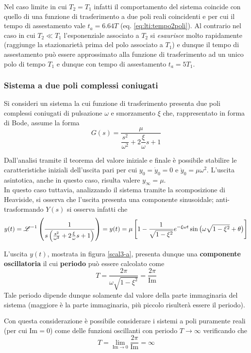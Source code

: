 			Nel caso limite in cui $T_2 = T_1$ infatti il comportamento del sistema coincide con quello di una funzione di trasferimento a due poli reali coincidenti e per cui il tempo di assestamento vale $t_a = 6.64 T$ (eq. \ref{eq:lti:tempo2poli}). Al contrario nel caso in cui $T_2 \ll T_1$ l'esponenziale associato a $T_2$ si \textit{esaurisce} molto rapidamente (raggiunge la stazionarietà prima del polo associato a $T_1$) e dunque il tempo di assestamento può essere approssimato alla funzione di trasferimento ad un unico polo di tempo $T_1$ e dunque con tempo di assestamento $t_a =5T_1$.
			
		\subsubsection{Sistema a due poli complessi coniugati}
			Si consideri un sistema la cui funzione di trasferimento presenta due poli complessi coniugati di pulsazione $\omega$ e smorzamento $\xi$ che, rappresentato in forma di Bode, assume la forma
			\[ G(s) = \frac \mu {\dfrac{s^2}{\omega^2} + 2 \dfrac \xi \omega s + 1} \] 
			
			Dall'analisi tramite il teorema del valore iniziale e finale è possibile stabilire le caratteristiche iniziali dell'uscita pari per cui $y_0 = \dot y_0 = 0$ e $\ddot y_0 = \mu \omega^2$.	L'uscita asintotica, anche in questo caso, risulta valere $y_\infty = \mu$. \\
			In questo caso tuttavia, analizzando il sistema tramite la scomposizione di Heaviside, si osserva che l'uscita presenta una componente sinusoidale; anti-trasformando $Y(s)$ si osserva infatti che
			\[ y(t) = \mathscr {L}^{-1} \left( \frac 1 {s \left( \frac{s^2}{\omega^2} + 2 \frac \xi \omega s + 1 \right)}   \right) = y(t) = \mu \left[ 1 - \frac 1 {\sqrt{1-\xi^2}} e^{-\xi\omega t} \sin\big(\omega \sqrt{1-\xi^2} + \theta\big) \right] \]
			
			L'uscita $y(t)$, mostrata in figura \ref{scal3-a}, presenta dunque una \textbf{componente oscillatoria} il cui \textbf{periodo} può essere calcolato come
			\begin{equation}
				T = \frac{2\pi}{\omega \sqrt{1-\xi^2}} = \frac{2\pi}{\textrm{Im}}	
			\end{equation}
			Tale periodo dipende dunque solamente dal valore della parte immaginaria del sistema (maggiore è la parte immaginaria, più piccolo risulterà essere il periodo).
			\begin{osservazione}
				Con questa considerazione è possibile considerare i sistemi a poli puramente reali (per cui $\textrm{Im} = 0$) come delle funzioni oscillanti con periodo $T\rightarrow \infty$ verificando che
				\[ T = \lim_{\textrm{Im}\rightarrow 0} \frac{2\pi}{\textrm{Im}} = \infty  \]
			\end{osservazione}
			
